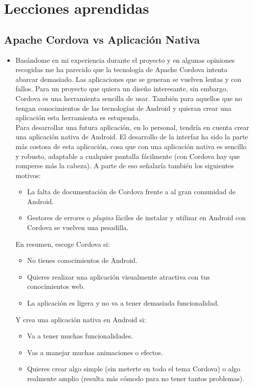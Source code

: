 \section{Lecciones aprendidas}

\subsection*{Apache Cordova vs Aplicación Nativa}
\begin{itemize}
\item Basándome en mi experiencia durante el proyecto y en algunas opiniones recogidas me ha parecido que la tecnología de Apache Cordova intenta abarcar demasiado. Las aplicaciones que se generan se vuelven lentas y con fallos. Para un proyecto que quiera un diseño interesante, sin embargo, Cordova es una herramienta sencilla de usar. También para aquellos que no tengan conocimientos de las tecnologías de Android y quieran crear una aplicación esta herramienta es estupenda.\\

Para desarrollar una futura aplicación, en lo personal, tendría en cuenta crear una aplicación nativa de Android. El desarrollo de la interfaz ha sido la parte más costosa de esta aplicación, cosa que con una aplicación nativa es sencillo y robusto, adaptable a cualquier pantalla fácilmente (con Cordova hay que romperse más la cabeza). A parte de eso señalaría también los siguientes motivos:
\begin{itemize}
\item La falta de documentación de Cordova frente a al gran comunidad de Android.
\item Gestores de errores o \textit{plugins} fáciles de instalar y utilizar en Android con Cordova se vuelven una pesadilla.
\end{itemize}
En resumen, escoge Cordova si:
\begin{itemize}
\item No tienes conocimientos de Android.
\item Quieres realizar una aplicación visualmente atractiva con tus conocimientos web.
\item La aplicación es ligera y no va a tener demasiada funcionalidad.
\end{itemize}
Y crea una aplicación nativa en Android si:
\begin{itemize}
\item Va a tener muchas funcionalidades.
\item Vas a manejar muchas animaciones o efectos.
\item Quieres crear algo simple (sin meterte en todo el tema Cordova) o algo realmente amplio (resulta más cómodo para no tener tantos problemas).
\end{itemize}
\end{itemize}

